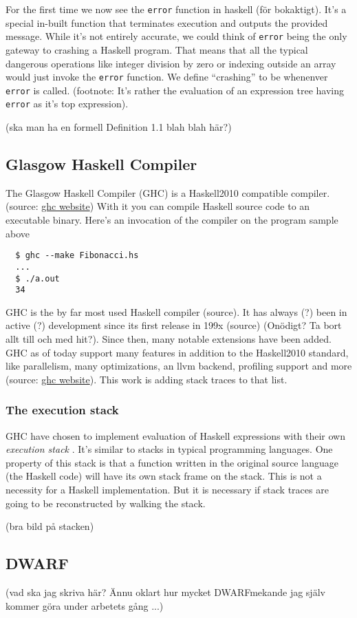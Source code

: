 For the first time we now see the \texttt{error} function in haskell (för
bokaktigt).  It's a special in-built function that terminates execution and
outputs the provided message. While it's not entirely accurate, we could think
of \texttt{error} being the only gateway to crashing a Haskell program. That
means that all the typical dangerous operations like integer division by zero
or indexing outside an array would just invoke the \texttt{error} function. We
define ``crashing'' to be whenenver \texttt{error} is called. (footnote: It's
rather the evaluation of an expression tree having \texttt{error} as it's top
expression).

(ska man ha en formell Definition 1.1 blah blah här?)

\subsection{Glasgow Haskell Compiler}

The Glasgow Haskell Compiler (GHC) is a Haskell2010 compatible compiler.
(source: \href{http://www.haskell.org/ghc/}{ghc website}) With it you can compile Haskell source code to an executable
binary. Here's an invocation of the compiler on the program sample above

\begin{verbatim}
  $ ghc --make Fibonacci.hs
  ...
  $ ./a.out
  34
\end{verbatim}

GHC is the by far most used Haskell compiler (source). It has always (?)
been in active (?) development since its first release in 199x (source) (Onödigt? Ta
bort allt till och med hit?). Since then, many notable extensions have been
added. GHC as of today support many features in addition to the Haskell2010
standard, like parallelism, many optimizations, an llvm backend, profiling
support and more (source: \href{http://www.haskell.org/ghc/}{ghc website}). This
work is adding stack traces to that list.

\subsubsection{The execution stack}

GHC have chosen to implement evaluation of Haskell expressions
with their own \emph{execution stack}
\cite{evalapplyjfp06} .
It's similar to stacks in typical programming languages. One property of this
stack is that a function written in the original source language (the Haskell
code) will have its own stack frame on the stack. This is not a
necessity for a Haskell implementation. But it is necessary if stack traces are
going to be reconstructed by walking the stack.

(bra bild på stacken)

\subsection{DWARF}

(vad ska jag skriva här? Ännu oklart hur mycket DWARFmekande jag själv kommer
göra under arbetets gång ...)

